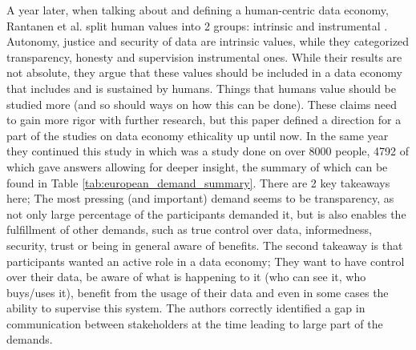 \documentclass[english, 12pt, a4paper, sci, utf8, a-2b, online]{aaltothesis}
\theoremstyle{change}
\theoremstyle{theoremstyle}
\begin{document}
A year later, when talking about and defining a human-centric data economy, Rantanen et al. split human values into 2 groups: intrinsic and instrumental \cite{rantanen2020ethical}. Autonomy, justice and security of data are intrinsic values, while they categorized transparency, honesty and supervision instrumental ones. While their results are not absolute, they argue that these values should be included in a data economy that includes and is sustained by humans. Things that humans value should be studied more (and so should ways on how this can be done). These claims need to gain more rigor with further research, but this paper defined a direction for a part of the studies on data economy ethicality up until now. 
In the same year they continued this study in \cite{rantanen2020humans} which was a study done on over 8000 people, 4792 of which gave answers allowing for deeper insight, the summary of which can be found in Table \ref{tab:european_demand_summary}. There are 2 key takeaways here; The most pressing (and important) demand seems to be transparency, as not only large percentage of the participants demanded it, but is also enables the fulfillment of other demands, such as true control over data, informedness, security, trust or being in general aware of benefits. The second takeaway is that participants wanted an active role in a data economy; They want to have control over their data, be aware of what is happening to it (who can see it, who buys/uses it), benefit from the usage of their data and even in some cases the ability to supervise this system. The authors correctly identified a gap in communication between stakeholders at the time leading to large part of the demands. 
\end{document}
